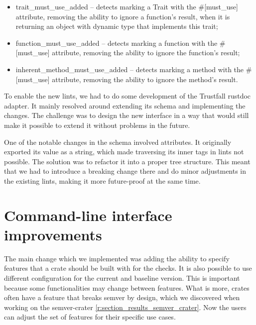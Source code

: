 \documentclass[licencjacka,en]{pracamgr}
\begin{document}
\begin{itemize}
    \item {\ttfamily trait\_must\_use\_added}
        -- detects marking a {\ttfamily Trait} with the {\ttfamily \#[must\_use]} attribute,
        removing the ability to ignore a function's result, when it is returning an object
        with dynamic type that implements this trait;
    \item {\ttfamily function\_must\_use\_added}
        -- detects marking a function with the {\ttfamily \#[must\_use]} attribute,
        removing the ability to ignore the function's result;
    \item {\ttfamily inherent\_method\_must\_use\_added}
        -- detects marking a method with the {\ttfamily \#[must\_use]} attribute,
        removing the ability to ignore the method's result.
\end{itemize}
To enable the new lints, we had to do some development of the Trustfall rustdoc adapter.
It mainly resolved around extending its schema and implementing the changes.
The challenge was to design the new interface in a way that would
still make it possible to extend it without problems in the future.

One of the notable changes in the schema involved attributes.
It originally exported its value as a string, which made traversing
its inner tags in lints not possible.
The solution was to refactor it into a proper tree structure.
This meant that we had to introduce a breaking change there
and do minor adjustments in the existing lints,
making it more future-proof at the same time.

\section{Command-line interface improvements}\label{r:section_cli}

The main change which we implemented was adding the ability to specify
features that a crate should be built with for the checks. It is also
possible to use different configuration for the current and baseline version.
This is important because some functionalities may change between features. What is more,
crates often have a feature that breaks semver by design, which
we discovered when working on the semver-crater \ref{r:section_results_semver_crater}.
Now the users can adjust the set of features for their specific use cases.
\end{document}
